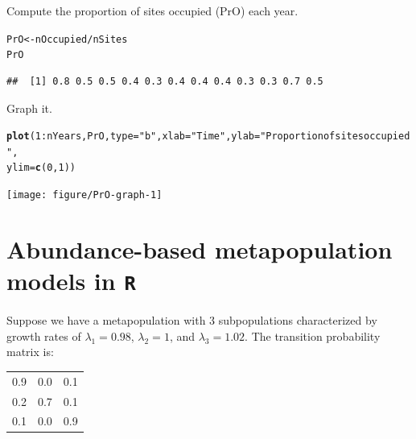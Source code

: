 \documentclass[12pt]{article}\usepackage[]{graphicx}\usepackage[]{xcolor}
\makeatletter
\newcommand{\hlnum}[1]{\textcolor[rgb]{0.686,0.059,0.569}{#1}}%
\newcommand{\hlsng}[1]{\textcolor[rgb]{0.192,0.494,0.8}{#1}}%
\newcommand{\hlopt}[1]{\textcolor[rgb]{0,0,0}{#1}}%
\newcommand{\hldef}[1]{\textcolor[rgb]{0.345,0.345,0.345}{#1}}%
\newcommand{\hlkwb}[1]{\textcolor[rgb]{0.69,0.353,0.396}{#1}}%
\newcommand{\hlkwc}[1]{\textcolor[rgb]{0.333,0.667,0.333}{#1}}%
\newcommand{\hlkwd}[1]{\textcolor[rgb]{0.737,0.353,0.396}{\textbf{#1}}}%
\newenvironment{kframe}{%
 \def\at@end@of@kframe{}%
 \ifinner\ifhmode%
  \def\at@end@of@kframe{\end{minipage}}%
  \begin{minipage}{\columnwidth}%
 \fi\fi%
 \def\FrameCommand##1{\hskip\@totalleftmargin \hskip-\fboxsep
 \colorbox{shadecolor}{##1}\hskip-\fboxsep
     \hskip-\linewidth \hskip-\@totalleftmargin \hskip\columnwidth}%
 \MakeFramed {\advance\hsize-\width
   \@totalleftmargin\z@ \linewidth\hsize
   \@setminipage}}%
 {\par\unskip\endMakeFramed%
 \at@end@of@kframe}
\newenvironment{knitrout}{}{} %
\makeatother
\begin{document}
\clearpage

Compute the proportion of sites occupied (PrO) each year.
\begin{knitrout}
\color{fgcolor}\begin{kframe}
\begin{alltt}
\hldef{PrO} \hlkwb{<-} \hldef{nOccupied} \hlopt{/} \hldef{nSites}
\hldef{PrO}
\end{alltt}
\begin{verbatim}
##  [1] 0.8 0.5 0.5 0.4 0.3 0.4 0.4 0.4 0.3 0.3 0.7 0.5
\end{verbatim}
\end{kframe}
\end{knitrout}

Graph it.
\begin{knitrout}
\color{fgcolor}\begin{kframe}
\begin{alltt}
\hlkwd{plot}\hldef{(}\hlnum{1}\hlopt{:}\hldef{nYears, PrO,} \hlkwc{type}\hldef{=}\hlsng{"b"}\hldef{,} \hlkwc{xlab}\hldef{=}\hlsng{"Time"}\hldef{,} \hlkwc{ylab}\hldef{=}\hlsng{"Proportion of sites occupied"}\hldef{,}
     \hlkwc{ylim}\hldef{=}\hlkwd{c}\hldef{(}\hlnum{0}\hldef{,} \hlnum{1}\hldef{))}
\end{alltt}
\end{kframe}
\texttt{[image: figure/PrO-graph-1]} 
\end{knitrout}


\clearpage

\section*{Abundance-based metapopulation models in \texttt{R}}

Suppose we have a metapopulation with 3 subpopulations characterized
by growth rates of $\lambda_1=0.98$, $\lambda_2=1$, and
$\lambda_3=1.02$. The transition probability matrix is:

\begin{table}[h!]
  \centering
  \begin{tabular}{ccc}
    \hline
    0.9 & 0.0 & 0.1 \\
    0.2 & 0.7 & 0.1 \\
    0.1 & 0.0 & 0.9 \\
    \hline
  \end{tabular}
\end{table}
\end{document}
